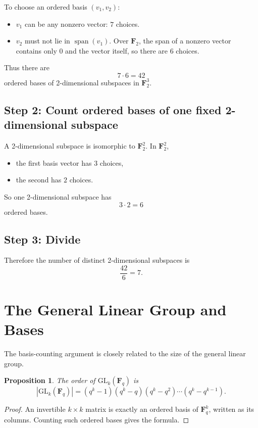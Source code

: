 \documentclass[11pt]{article}
\newtheorem{proposition}[theorem]{Proposition}
\theoremstyle{definition}
\theoremstyle{remark}
\newcommand{\F}{\mathbf{F}}
\newcommand{\Span}{\operatorname{span}}
\newcommand{\GL}{\mathrm{GL}}
\begin{document}
	To choose an ordered basis \((v_1,v_2)\):
	
	\begin{itemize}
		\item \(v_1\) can be any nonzero vector: \(7\) choices.
		\item \(v_2\) must not lie in \(\Span(v_1)\). Over \(\F_2\), the span of a nonzero vector contains only \(0\) and the vector itself, so there are \(6\) choices.
	\end{itemize}
	
	Thus there are
	\[
	7\cdot 6=42
	\]
	ordered bases of 2-dimensional subspaces in \(\F_2^3\).
	
	\subsection*{Step 2: Count ordered bases of one fixed 2-dimensional subspace}
	
	A 2-dimensional subspace is isomorphic to \(\F_2^2\). In \(\F_2^2\),
	
	\begin{itemize}
		\item the first basis vector has \(3\) choices,
		\item the second has \(2\) choices.
	\end{itemize}
	
	So one 2-dimensional subspace has
	\[
	3\cdot 2=6
	\]
	ordered bases.
	
	\subsection*{Step 3: Divide}
	
	Therefore the number of distinct 2-dimensional subspaces is
	\[
	\frac{42}{6}=7.
	\]
	
	\section{The General Linear Group and Bases}
	
	The basis-counting argument is closely related to the size of the general linear group.
	
	\begin{proposition}
		The order of \(\GL_k(\F_q)\) is
		\[
		|\GL_k(\F_q)|
		=
		(q^k-1)(q^k-q)(q^k-q^2)\cdots(q^k-q^{k-1}).
		\]
	\end{proposition}
	
	\begin{proof}
		An invertible \(k\times k\) matrix is exactly an ordered basis of \(\F_q^k\), written as its columns. Counting such ordered bases gives the formula.
	\end{proof}
	
\end{document}
